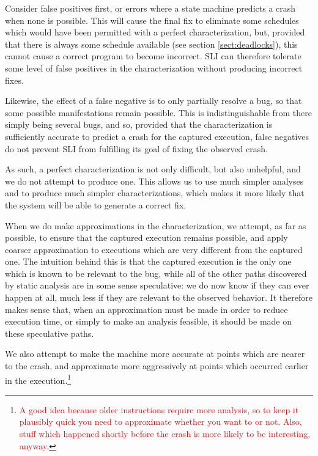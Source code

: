 \documentclass[10pt,twocolumn,preprint,natbib,authoryear]{sigplanconf}
\newcommand{\editorial}[1]{\textcolor{red}{\footnote{\textcolor{red}{#1}}}}
\begin{document}
Consider false positives first, or errors where a state machine
predicts a crash when none is possible.  This will cause the final fix
to eliminate some schedules which would have been permitted with a
perfect characterization, but, provided that there is always some
schedule available (see section \ref{sect:deadlocks}), this cannot
cause a correct program to become incorrect.  SLI can therefore
tolerate some level of false positives in the characterization without
producing incorrect fixes.

Likewise, the effect of a false negative is to only partially resolve
a bug, so that some possible manifestations remain possible.  This is
indistinguishable from there simply being several bugs, and so,
provided that the characterization is sufficiently accurate to predict
a crash for the captured execution, false negatives do not prevent SLI
from fulfilling its goal of fixing the observed crash.

As such, a perfect characterization is not only difficult, but also
unhelpful, and we do not attempt to produce one.  This allows us to
use much simpler analyses and to produce much simpler
characterizations, which makes it more likely that the system will be
able to generate a correct fix.

When we do make approximations in the characterization, we attempt, as
far as possible, to ensure that the captured execution remains
possible, and apply coarser approximation to executions which are very
different from the captured one.  The intuition behind this is that
the captured execution is the only one which is known to be relevant
to the bug, while all of the other paths discovered by static analysis
are in some sense speculative: we do now know if they can ever happen
at all, much less if they are relevant to the observed behavior.  It
therefore makes sense that, when an approximation must be made in
order to reduce execution time, or simply to make an analysis
feasible, it should be made on these speculative paths.

We also attempt to make the machine more accurate at points which are
nearer to the crash, and approximate more aggressively at points which
occurred earlier in the execution.\editorial{A good idea because older
  instructions require more analysis, so to keep it plausibly quick
  you need to approximate whether you want to or not.  Also, stuff
  which happened shortly before the crash is more likely to be
  interesting, anyway.}
\end{document}
